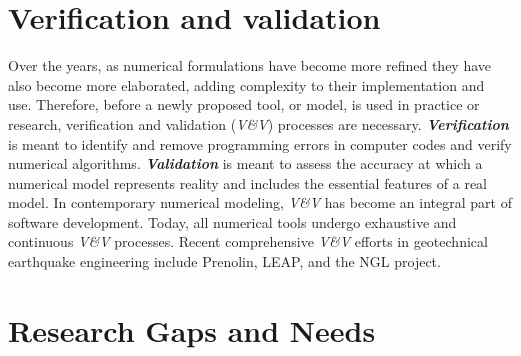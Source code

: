 \section{Verification and validation} 
\label{sec:resp_geotech_7}

Over the years, as numerical formulations have become more refined they have also become more elaborated, adding complexity to their implementation and use. Therefore, before a newly proposed tool, or model, is used in practice or research, verification and validation (\emph{V\&V}) processes are necessary. \textbf{\emph{Verification}} is meant to identify and remove programming errors in computer codes and verify numerical algorithms. \textbf{\emph{Validation}} is meant to assess the accuracy at which a numerical model represents reality and includes the essential features of a real model. In contemporary numerical modeling, \emph{V\&V} has become an integral part of software development. Today, all numerical tools undergo exhaustive and continuous \emph{V\&V} processes. Recent comprehensive \emph{V\&V} efforts in geotechnical earthquake engineering include Prenolin, LEAP, and the NGL project. 

\section{Research Gaps and Needs}
\label{sec:resp_geotech_8}


